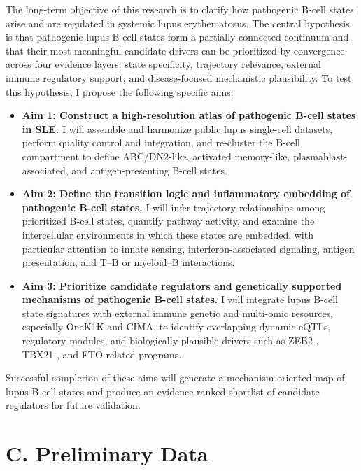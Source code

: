 The long-term objective of this research is to clarify how pathogenic B-cell states arise and are regulated in systemic lupus erythematosus. The central hypothesis is that pathogenic lupus B-cell states form a partially connected continuum and that their most meaningful candidate drivers can be prioritized by convergence across four evidence layers: state specificity, trajectory relevance, external immune regulatory support, and disease-focused mechanistic plausibility. To test this hypothesis, I propose the following specific aims:

\begin{itemize}[leftmargin=*]
    \item \textbf{Aim 1: Construct a high-resolution atlas of pathogenic B-cell states in SLE.} I will assemble and harmonize public lupus single-cell datasets, perform quality control and integration, and re-cluster the B-cell compartment to define ABC/DN2-like, activated memory-like, plasmablast-associated, and antigen-presenting B-cell states.
    
    \item \textbf{Aim 2: Define the transition logic and inflammatory embedding of pathogenic B-cell states.} I will infer trajectory relationships among prioritized B-cell states, quantify pathway activity, and examine the intercellular environments in which these states are embedded, with particular attention to innate sensing, interferon-associated signaling, antigen presentation, and T--B or myeloid--B interactions.
    
    \item \textbf{Aim 3: Prioritize candidate regulators and genetically supported mechanisms of pathogenic B-cell states.} I will integrate lupus B-cell state signatures with external immune genetic and multi-omic resources, especially OneK1K and CIMA, to identify overlapping dynamic eQTLs, regulatory modules, and biologically plausible drivers such as ZEB2-, TBX21-, and FTO-related programs.
\end{itemize}

Successful completion of these aims will generate a mechanism-oriented map of lupus B-cell states and produce an evidence-ranked shortlist of candidate regulators for future validation.

\section*{C. Preliminary Data}

